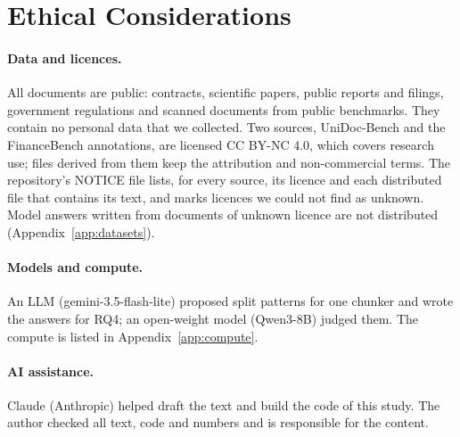\section*{Ethical Considerations}

\paragraph{Data and licences.} All documents are public: contracts,
scientific papers, public reports and filings, government regulations
and scanned documents from public benchmarks. They contain no personal
data that we collected. Two sources, UniDoc-Bench and the FinanceBench
annotations, are licensed CC BY-NC 4.0, which covers research use; files
derived from them keep the attribution and non-commercial terms. The
repository's NOTICE file lists, for every source, its licence and each
distributed file that contains its text, and marks licences we could not
find as unknown. Model answers written from documents of unknown licence
are not distributed (Appendix~\ref{app:datasets}).

\paragraph{Models and compute.} An LLM (gemini-3.5-flash-lite) proposed
split patterns for one chunker and wrote the answers for RQ4; an
open-weight model (Qwen3-8B) judged them. The compute is listed in
Appendix~\ref{app:compute}.

\paragraph{AI assistance.} Claude (Anthropic) helped draft the text and
build the code of this study. The author checked all text, code and
numbers and is responsible for the content.
